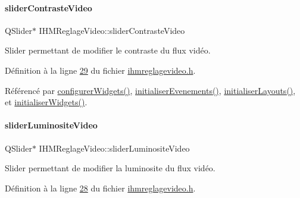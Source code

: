 \mbox{\label{class_i_h_m_reglage_video_a69917b4179132a63efe6c3fb63ba666a}} 
\paragraph{\texorpdfstring{slider\+Contraste\+Video}{sliderContrasteVideo}}
{\footnotesize\ttfamily Q\+Slider$\ast$ I\+H\+M\+Reglage\+Video\+::slider\+Contraste\+Video\hspace{0.3cm}{\ttfamily [private]}}



Slider permettant de modifier le contraste du flux vidéo. 



Définition à la ligne \hyperlink{ihmreglagevideo_8h_source_l00029}{29} du fichier \hyperlink{ihmreglagevideo_8h_source}{ihmreglagevideo.\+h}.



Référencé par \hyperlink{ihmreglagevideo_8cpp_source_l00047}{configurer\+Widgets()}, \hyperlink{ihmreglagevideo_8cpp_source_l00105}{initialiser\+Evenements()}, \hyperlink{ihmreglagevideo_8cpp_source_l00061}{initialiser\+Layouts()}, et \hyperlink{ihmreglagevideo_8cpp_source_l00023}{initialiser\+Widgets()}.

\mbox{\label{class_i_h_m_reglage_video_a333b7f1b3239abd5823e0b0f2857716b}} 
\paragraph{\texorpdfstring{slider\+Luminosite\+Video}{sliderLuminositeVideo}}
{\footnotesize\ttfamily Q\+Slider$\ast$ I\+H\+M\+Reglage\+Video\+::slider\+Luminosite\+Video\hspace{0.3cm}{\ttfamily [private]}}



Slider permettant de modifier la luminosite du flux vidéo. 



Définition à la ligne \hyperlink{ihmreglagevideo_8h_source_l00028}{28} du fichier \hyperlink{ihmreglagevideo_8h_source}{ihmreglagevideo.\+h}.



